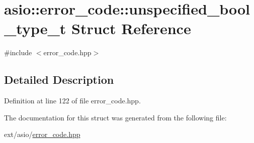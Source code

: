 \hypertarget{structasio_1_1error__code_1_1unspecified__bool__type__t}{}\section{asio\+:\+:error\+\_\+code\+:\+:unspecified\+\_\+bool\+\_\+type\+\_\+t Struct Reference}
\label{structasio_1_1error__code_1_1unspecified__bool__type__t}


{\ttfamily \#include $<$error\+\_\+code.\+hpp$>$}



\subsection{Detailed Description}


Definition at line 122 of file error\+\_\+code.\+hpp.



The documentation for this struct was generated from the following file\+:\begin{DoxyCompactItemize}
\item 
ext/asio/\hyperlink{error__code_8hpp}{error\+\_\+code.\+hpp}\end{DoxyCompactItemize}
